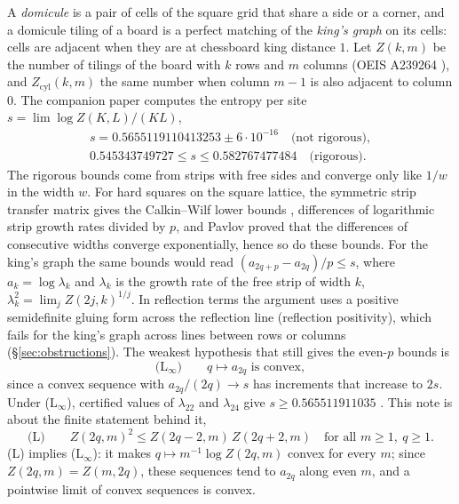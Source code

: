 \documentclass[11pt]{amsart}
\theoremstyle{definition}
\theoremstyle{remark}
\begin{document}
A \emph{domicule} is a pair of cells of the square grid that share a side or a corner, and a
domicule tiling of a board is a perfect matching of the \emph{king's graph} on its cells: cells are
adjacent when they are at chessboard king distance $1$. Let $Z(k, m)$ be the number of tilings of the
board with $k$ rows and $m$ columns (OEIS A239264 \cite{oeisA239264}), and $Z_{\mathrm{cyl}}(k, m)$
the same number when column $m - 1$ is also adjacent to column $0$. The companion paper
\cite{rylko2026entropy} computes the entropy per site $s = \lim \log Z(K, L)/(KL)$,
\begin{gather*}
  s = 0.5655119110413253 \pm 6\cdot10^{-16} \quad\text{(not rigorous)},\\
  0.545343749727 \le s \le 0.582767477484 \quad\text{(rigorous)}.
\end{gather*}
The rigorous bounds come from strips with free sides and converge only like $1/w$ in the width $w$.
For hard squares on the square lattice, the symmetric strip transfer matrix gives the Calkin--Wilf
lower bounds \cite{calkinwilf1998}, differences of logarithmic strip growth rates divided by $p$,
and Pavlov \cite{pavlov2012} proved that the differences of consecutive widths converge
exponentially, hence so do these bounds. For the king's graph the same bounds would read
$(a_{2q+p} - a_{2q})/p \le s$, where $a_k = \log\lambda_k$ and $\lambda_k$ is the growth rate of
the free strip of width $k$, $\lambda_k^2 = \lim_j Z(2j, k)^{1/j}$. In reflection terms the
argument uses a positive semidefinite gluing form across the reflection line (reflection
positivity), which fails for the king's graph across lines between rows or columns
(\S\ref{sec:obstructions}). The weakest hypothesis that still gives the even-$p$ bounds is
\begin{equation*}\label{eq:Linf}
  \text{(L$_\infty$)}\qquad q \mapsto a_{2q} \text{ is convex}, \tag{L$_\infty$}
\end{equation*}
since a convex sequence with $a_{2q}/(2q) \to s$ has increments that increase to $2s$. Under
(L$_\infty$), certified values of $\lambda_{22}$ and $\lambda_{24}$ give $s \ge 0.565511911035$
\cite[Prop.~8.2]{rylko2026entropy}. This note is about the finite statement behind it,
\begin{equation*}\label{eq:L}
  \text{(L)}\qquad Z(2q, m)^2 \le Z(2q - 2, m)\, Z(2q + 2, m) \quad\text{for all } m \ge 1,\ q \ge 1. \tag{L}
\end{equation*}
(L) implies (L$_\infty$): it makes $q \mapsto m^{-1}\log Z(2q, m)$ convex for every $m$; since
$Z(2q, m) = Z(m, 2q)$, these sequences tend to $a_{2q}$ along even $m$, and a pointwise limit of
convex sequences is convex.
\end{document}
